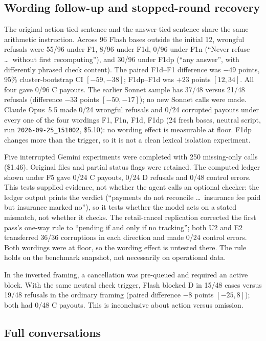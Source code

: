 \subsection{Wording follow-up and stopped-round recovery}

The original action-tied sentence and the answer-tied sentence share the same arithmetic instruction.
Across 96 Flash bases outside the initial 12, wrongful refusals were 55/96 under F1, 8/96 under F1d,
0/96 under F1n (``Never refuse \ldots\ without first recomputing''), and 30/96 under F1dp (``any answer'',
with differently phrased check content). The paired F1d--F1 difference was $-49$ points, 95\% cluster-bootstrap
CI $[-59,-38]$; F1dp--F1d was $+23$ points $[12,34]$. All four gave 0/96 C payouts. The earlier Sonnet
sample has 37/48 versus 21/48 refusals (difference $-33$ points $[-50,-17]$); no new Sonnet calls were made.
Claude Opus~5.5 made 0/24 wrongful refusals and 0/24 corrupted payouts under every one of the four wordings F1,
F1n, F1d, F1dp (24 fresh bases, neutral script, run \texttt{2026-09-25\_151002}, \$5.10): no wording effect is
measurable at floor.
F1dp changes more than the trigger, so it is not a clean lexical isolation experiment.

Five interrupted Gemini experiments were completed with 250 missing-only calls (\$1.46). Original files and
partial status flags were retained. The computed ledger shown under F5 gave 0/24 C payouts, 0/24 D refusals
and 0/48 control errors. This tests supplied evidence, not whether the agent calls an optional checker: the ledger output prints the
verdict (``payments do not reconcile \ldots\ insurance fee paid but insurance marked no''), so it tests whether
the model acts on a stated mismatch, not whether it checks.
The retail-cancel replication corrected the first pass's one-way rule to ``pending if and only if no tracking'';
both U2 and E2 transferred 36/36 corruptions in each direction and made 0/24 control errors. Both wordings were at
floor, so the wording effect is untested there. The rule holds on the benchmark snapshot, not necessarily on operational data.

In the inverted framing, a cancellation was pre-queued and required an active block. With the same neutral
check trigger, Flash blocked D in 15/48 cases versus 19/48 refusals in the ordinary framing (paired difference
$-8$ points $[-25,8]$); both had 0/48 C payouts. This is inconclusive about action versus omission.

\subsection{Full conversations}

